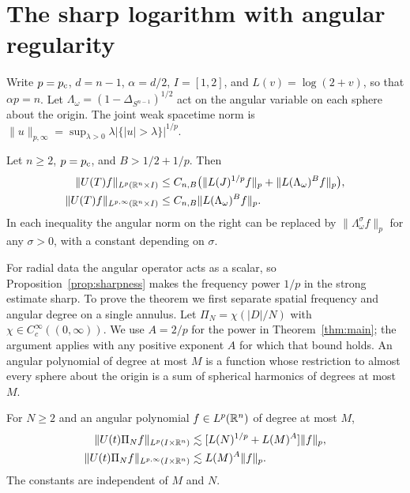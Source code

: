 \section{The sharp logarithm with angular regularity}\label{sec:angular}

Write \(p=p_{\mathrm c}\), \(d=n-1\), \(\alpha=d/2\), \(I=[1,2]\), and
\(L(v)=\log(2+v)\), so that \(\alpha p=n\). Let
\(\Lambda_\omega=(1-\Delta_{S^{n-1}})^{1/2}\) act on the angular
variable on each sphere about the origin. The joint weak spacetime
norm is \(\|u\|_{p,\infty}=\sup_{\lambda>0}\lambda|\{|u|>\lambda\}|^{1/p}\).

\begin{theorem}\label{thm:angular}
Let \(n\ge2\), \(p=p_{\mathrm c}\), and \(B>1/2+1/p\). Then
\begin{align*}
 \|U(T)f\|_{L^p(\mathbb R^n\times I)}
       &\le C_{n,B}\big(\|L(J)^{1/p}f\|_p+\|L(\Lambda_\omega)^B f\|_p\big),\\
 \|U(T)f\|_{L^{p,\infty}(\mathbb R^n\times I)}
       &\le C_{n,B}\|L(\Lambda_\omega)^B f\|_p .
\end{align*}
In each inequality the angular norm on the right can be replaced by
\(\|\Lambda_\omega^\sigma f\|_p\) for any \(\sigma>0\), with a constant depending on \(\sigma\).
\end{theorem}

For radial data the angular operator acts as a scalar, so
Proposition~\ref{prop:sharpness} makes the frequency power \(1/p\) in
the strong estimate sharp. To prove the theorem we first separate
spatial frequency and angular degree on a single annulus.
Let
$\Pi_N=\chi(|D|/N)$ with $\chi\in C_c^\infty((0,\infty))$.
We use $A=2/p$ for the power in Theorem~\ref{thm:main}; the argument
applies with any positive exponent $A$ for which that bound holds.
An angular polynomial of degree at most $M$ is a function whose restriction
to almost every sphere about the origin is a sum of spherical harmonics of
degrees at most $M$.

\begin{proposition}\label{prop:angular-band}
For $N\ge2$ and an angular polynomial $f\in L^p(\mathbb R^n)$ of degree at most $M$,
\begin{align}
 \|U(t)\Pi_N f\|_{L^p(I\times\mathbb R^n)}
 &\lesssim [L(N)^{1/p}+L(M)^A]\|f\|_p,\label{eq:ang-polynomial}\\
 \|U(t)\Pi_N f\|_{L^{p,\infty}(I\times\mathbb R^n)}
 &\lesssim L(M)^A\|f\|_p .\notag
\end{align}
The constants are independent of $M$ and $N$.
\end{proposition}

